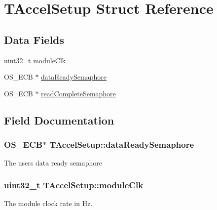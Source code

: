 \hypertarget{struct_t_accel_setup}{}\section{T\+Accel\+Setup Struct Reference}
\label{struct_t_accel_setup}
\subsection*{Data Fields}
\begin{DoxyCompactItemize}
\item 
uint32\+\_\+t \hyperlink{struct_t_accel_setup_adaad597e85b7fd2ac99d3a9ff8753d94}{module\+Clk}
\item 
O\+S\+\_\+\+E\+C\+B $\ast$ \hyperlink{struct_t_accel_setup_aac3cfcbfb450fd63dfae843d1d23c793}{data\+Ready\+Semaphore}
\item 
O\+S\+\_\+\+E\+C\+B $\ast$ \hyperlink{struct_t_accel_setup_a5f8d20dd0fc4852e451766e44c053aa1}{read\+Complete\+Semaphore}
\end{DoxyCompactItemize}


\subsection{Field Documentation}
\hypertarget{struct_t_accel_setup_aac3cfcbfb450fd63dfae843d1d23c793}{}
\subsubsection[{data\+Ready\+Semaphore}]{\setlength{\rightskip}{0pt plus 5cm}O\+S\+\_\+\+E\+C\+B$\ast$ T\+Accel\+Setup\+::data\+Ready\+Semaphore}\label{struct_t_accel_setup_aac3cfcbfb450fd63dfae843d1d23c793}
The user\textquotesingle{}s data ready semaphore \hypertarget{struct_t_accel_setup_adaad597e85b7fd2ac99d3a9ff8753d94}{}
\subsubsection[{module\+Clk}]{\setlength{\rightskip}{0pt plus 5cm}uint32\+\_\+t T\+Accel\+Setup\+::module\+Clk}\label{struct_t_accel_setup_adaad597e85b7fd2ac99d3a9ff8753d94}
The module clock rate in Hz. \hypertarget{struct_t_accel_setup_a5f8d20dd0fc4852e451766e44c053aa1}{}

